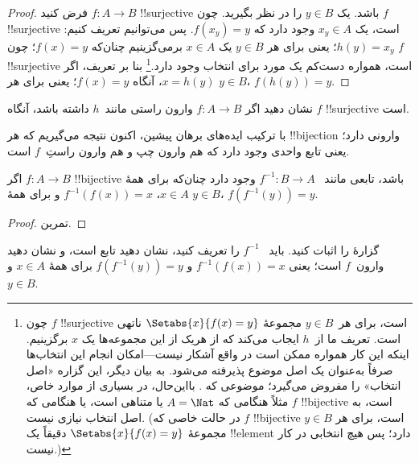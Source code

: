 \documentclass[../../../include/open-logic-section]{subfiles}
\begin{document}
\begin{proof}
فرض کنید $f\colon A \to B$ !!{surjective} باشد. یک $y \in
B$ را در نظر بگیرید. چون $f$ !!{surjective} است، یک $x_y \in A$ وجود دارد که $f(x_y)
= y$. پس می‌توانیم تعریف کنیم: $h(y) = x_y$؛ یعنی برای هر $y \in B$
یک $x \in A$ برمی‌گزینیم چنان‌که $f(x) = y$؛ چون $f$ !!{surjective} است،
همواره دست‌کم یک مورد برای انتخاب وجود دارد.\footnote{چون $f$
!!{surjective} است، برای هر~$y \in B$ مجموعهٔ $\Setabs{x}{f(x) = y}$
ناتهی است. تعریف ما از~$h$ ایجاب می‌کند که از هریک از این مجموعه‌ها یک $x$
برگزینیم. اینکه این کار همواره ممکن است در واقع
آشکار نیست---امکان انجام این انتخاب‌ها صرفاً به‌عنوان یک اصل موضوع پذیرفته می‌شود.
به بیان دیگر، این گزاره «اصل انتخاب» را مفروض می‌گیرد؛ موضوعی که
.
بااین‌حال، در بسیاری از موارد خاص، مثلاً هنگامی که $A = \Nat$ یا متناهی است، یا هنگامی که $f$ !!{bijective} است،
به اصل انتخاب نیازی نیست. (در حالت خاصی که $f$ !!{bijective} است، برای هر $y \in B$ مجموعهٔ
$\Setabs{x}{f(x) = y}$ دقیقاً یک !!{element} دارد؛ پس هیچ انتخابی در کار نیست.)}
بنا بر تعریف، اگر $x = h(y)$،
آنگاه $f(x) = y$؛ یعنی برای هر $y \in B$، $f(h(y)) = y$.
\end{proof}

\begin{prob}
نشان دهید اگر $f\colon A \to B$ وارون راستی مانند~$h$ داشته باشد، آنگاه $f$
!!{surjective} است.
\end{prob}

\begin{explain}
  با ترکیب ایده‌های برهان پیشین، اکنون نتیجه می‌گیریم که هر
  !!{bijection} وارونی دارد؛ یعنی تابع واحدی وجود دارد
  که هم وارون چپ و هم وارون راستِ~$f$ است.
\end{explain}

\begin{prop}
اگر $f\colon A \to B$ !!{bijective} باشد، تابعی مانند
~$f^{-1}\colon B \to A$ وجود دارد چنان‌که برای همهٔ $x \in A$،
$f^{-1}(f(x)) = x$ و برای همهٔ $y \in B$، $f(f^{-1}(y)) = y$.
\end{prop}

\begin{proof}
تمرین.
\end{proof}

\begin{prob}
گزارهٔ  را اثبات کنید. باید
~$f^{-1}$ را تعریف کنید، نشان دهید تابع است، و نشان دهید
وارون~$f$ است؛ یعنی $f^{-1}(f(x)) = x$ و $f(f^{-1}(y)) = y$ برای
همهٔ $x \in A$ و $y \in B$.
\end{prob}
\end{document}

